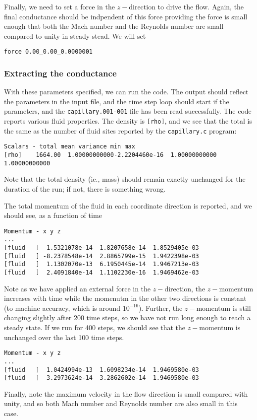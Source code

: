 Finally, we need to set a force in the $z-$direction to drive the
flow. Again, the final conductance should be indpendent of this
force providing the force is small enough that both the Mach number
and the Reynolds number are small compared to unity in steady stead.
We will set
\begin{verbatim}
force 0.00_0.00_0.0000001
\end{verbatim}

\subsubsection{Extracting the conductance}

With these parameters specified, we can run the code. The output
should reflect the parameters in the input file, and the time step
loop should start if the parameters, and the \texttt{capillary.001-001}
file has been read successfully. The code reports various fluid
properties. The density is \texttt{[rho]}, and we see that the
total is the same as the number of fluid sites reported by the
\texttt{capillary.c} program:
\begin{verbatim}
Scalars - total mean variance min max
[rho]    1664.00  1.00000000000-2.2204460e-16  1.00000000000 1.00000000000
\end{verbatim}
Note that the total density (ie., mass) should remain exactly unchanged
for the duration of the run; if not, there is something wrong.

The total momentum of the fluid in each coordinate direction is
reported, and we should see, as a function of time
\begin{verbatim}
Momentum - x y z
...
[fluid   ]  1.5321078e-14  1.8207658e-14  1.8529405e-03
[fluid   ] -8.2378548e-14  2.8865799e-15  1.9422398e-03
[fluid   ]  1.1302070e-13  6.1950445e-14  1.9467213e-03
[fluid   ]  2.4091840e-14  1.1102230e-16  1.9469462e-03
\end{verbatim}
Note as we have applied an external force in the $z-$direction,
the $z-$momentum increases with time while the momenutm in the
other two directions is constant (to machine accuracy, which is
around $10^{-16}$). Further, the $z-$momentum
is still changing slightly after 200 time steps, so we have
not run long enough to reach a steady state. If we run for
400 steps, we should see that the $z-$momentum is unchanged
over the last 100 time steps.
\begin{verbatim}
Momentum - x y z
...
[fluid   ]  1.0424994e-13  1.6098234e-14  1.9469580e-03
[fluid   ]  3.2973624e-14  3.2862602e-14  1.9469580e-03
\end{verbatim}
Finally, note the maximum velocity in the flow direction
is small compared with unity, and so both Mach number and
Reynolds number are also small in this case.


